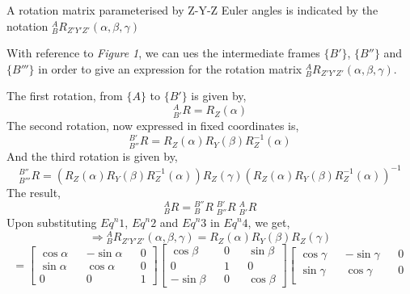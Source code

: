 \documentclass[a4paper]{article}
\begin{document}
\begin{qalist}
			A rotation matrix parameterised by Z-Y-Z Euler angles is indicated by the notation ${}^{A}_{B}{R}_{Z'Y'Z'}(\alpha, \beta, \gamma)$
			
			With reference to \textit{Figure 1}, we can ues the intermediate frames $\{B'\}$, $\{B''\}$ and $\{B'''\}$ in order to give an expression for the rotation matrix ${}^{A}_{B}{R}_{Z'Y'Z'}(\alpha, \beta, \gamma)$.
			
			The first rotation, from $\{A\}$ to $\{B'\}$ is given by,
			\begin{equation}
				{}^{A}_{B'}{R} = {R}_{Z}(\alpha)
			\end{equation}
			The second rotation, now expressed in fixed coordinates is, 
			\begin{equation}
				{}^{B'}_{B''}{R} = {R}_{Z}(\alpha){R}_{Y}(\beta){R}^{-1}_{Z}(\alpha)
			\end{equation}
			And the third rotation is given by,
			\begin{equation}
				{}^{B''}_{B'''}{R} =({R}_{Z}(\alpha){R}_{Y}(\beta){R}^{-1}_{Z}(\alpha)) {R}_{Z}(\gamma) {({R}_{Z}(\alpha){R}_{Y}(\beta){R}^{-1}_{Z}(\alpha))}^{-1}
			\end{equation}
			The result, 
			\begin{equation}
				{}^{A}_{B}{R} =  {}^{B''}_{B}{R}\;{}^{B'}_{B''}{R}\;{}^{A}_{B'}{R}
			\end{equation}
			Upon substituting ${Eq}^{n}1$, ${Eq}^{n}2$ and ${Eq}^{n}3$ in ${Eq}^{n}4$, we get, 
			\begin{equation}
				\Rightarrow {}^{A}_{B}{R}_{Z'Y'Z'}(\alpha, \beta, \gamma) = {R}_{Z}(\alpha){R}_{Y}(\beta){R}_{Z}(\gamma)
			\end{equation}
			\begin{equation}
				= \left[ \begin{matrix}
					\cos\alpha && -\sin\alpha && 0 \\
					\sin\alpha && \cos\alpha && 0 \\
					0 && 0 && 1
				\end{matrix}\right]
				\left[ \begin{matrix}
					\cos\beta && 0 && \sin\beta \\
					0 && 1 && 0 \\
					-\sin\beta && 0 && \cos\beta
				\end{matrix}\right]
				\left[ \begin{matrix}
					\cos\gamma && -\sin\gamma && 0 \\
					\sin\gamma && \cos\gamma && 0 \\

\end{matrix}
\end{equation}
\end{qalist}
\end{document}
